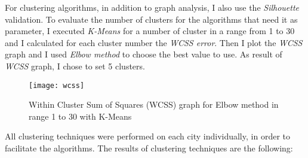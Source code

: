 For clustering algorithms, in addition to graph analysis, I also use the \textit{Silhouette} validation. To evaluate the number of clusters for the algorithms that need it as parameter, I executed \textit{K-Means} for a number of cluster in a range from 1 to 30 and I calculated for each cluster number the \textit{WCSS error}. Then I plot the \textit{WCSS} graph and I used \textit{Elbow method} to choose the best value to use. As result of \textit{WCSS} graph, I chose to set 5 clusters. 

\begin{figure}[bt]
	\centering
	\texttt{[image: wcss]}
	\caption{Within Cluster Sum of Squares (WCSS) graph for Elbow method in range 1 to 30 with K-Means}
	\label{fig:wcss}
\end{figure}

All clustering techniques were performed on each city individually, in order to facilitate the algorithms. The results of clustering techniques are the following: 

